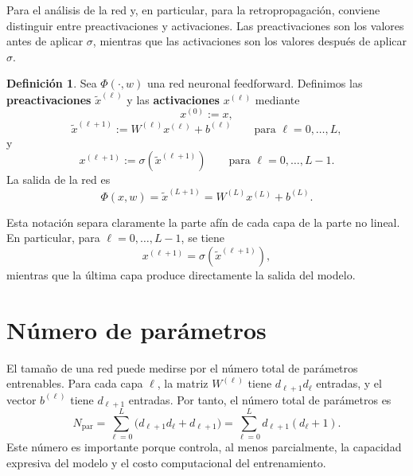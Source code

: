 \documentclass[11pt]{report}
\newenvironment{tcolorbox}[1][]{\par\medskip\noindent\ignorespaces}{\par\medskip}
\theoremstyle{definition}
\newtheorem{definicion}{Definición}[section]
\theoremstyle{plain}
\numberwithin{equation}{section}
\begin{document}
Para el análisis de la red y, en particular, para la retropropagación, conviene distinguir entre preactivaciones y activaciones. Las preactivaciones son los valores antes de aplicar \(\sigma\), mientras que las activaciones son los valores después de aplicar \(\sigma\).

\begin{tcolorbox}[colback=blue!8, colframe=blue!8, boxrule=0pt]
\begin{definicion}
Sea \(\Phi(\cdot,w)\) una red neuronal feedforward. Definimos las \textbf{preactivaciones} \(\widetilde{x}^{(\ell)}\) y las \textbf{activaciones} \(x^{(\ell)}\) mediante
\begin{equation*}
    x^{(0)}:=x,
\end{equation*}
\begin{equation*}
    \widetilde{x}^{(\ell+1)}
    :=
    W^{(\ell)}x^{(\ell)}+b^{(\ell)}
    \qquad
    \text{para } \ell=0,\ldots,L,
\end{equation*}
y
\begin{equation*}
    x^{(\ell+1)}
    :=
    \sigma(\widetilde{x}^{(\ell+1)})
    \qquad
    \text{para } \ell=0,\ldots,L-1.
\end{equation*}
La salida de la red es
\begin{equation*}
    \Phi(x,w)
    =
    \widetilde{x}^{(L+1)}
    =
    W^{(L)}x^{(L)}+b^{(L)}.
\end{equation*}
\end{definicion}
\end{tcolorbox}

Esta notación separa claramente la parte afín de cada capa de la parte no lineal. En particular, para \(\ell=0,\ldots,L-1\), se tiene
\begin{equation*}
    x^{(\ell+1)}
    =
    \sigma(\widetilde{x}^{(\ell+1)}),
\end{equation*}
mientras que la última capa produce directamente la salida del modelo.

\section{Número de parámetros}

El tamaño de una red puede medirse por el número total de parámetros entrenables. Para cada capa \(\ell\), la matriz \(W^{(\ell)}\) tiene \(d_{\ell+1}d_\ell\) entradas, y el vector \(b^{(\ell)}\) tiene \(d_{\ell+1}\) entradas. Por tanto, el número total de parámetros es
\begin{equation*}
    N_{\mathrm{par}}
    =
    \sum_{\ell=0}^{L}
    \bigl(d_{\ell+1}d_\ell+d_{\ell+1}\bigr)
    =
    \sum_{\ell=0}^{L}
    d_{\ell+1}(d_\ell+1).
\end{equation*}
Este número es importante porque controla, al menos parcialmente, la capacidad expresiva del modelo y el costo computacional del entrenamiento.
\end{document}
